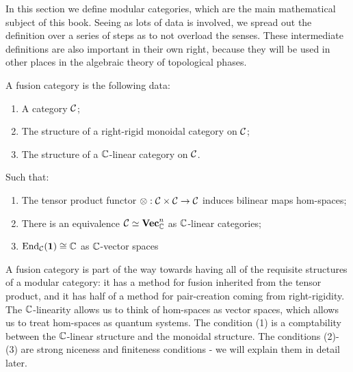 In this section we define modular categories, which are the main mathematical subject of this book. Seeing as lots of data is involved, we spread out the definition over a series of steps as to not overload the senses. These intermediate definitions are also important in their own right, because they will be used in other places in the algebraic theory of topological phases.


\begin{defn} A fusion category is the following data:

\begin{enumerate}
\item A category ${\mathcal C}$;
\item The structure of a right-rigid monoidal category on ${\mathcal C}$;
\item The structure of a ${\mathbb C}$-linear category on ${\mathcal C}$.
\end{enumerate}

Such that:

\begin{enumerate}
\item The tensor product functor $\otimes: {\mathcal C}\times {\mathcal C}\to {\mathcal C}$ induces bilinear maps hom-spaces;
\item There is an equivalence ${\mathcal C} \simeq {\bf Vec}_{\mathbb C}^n$ as ${\mathbb C}$-linear categories;
\item $\operatorname{End}_{\mathcal C}({\mathbf 1})\cong {\mathbb C}$ as ${\mathbb C}$-vector spaces
\end{enumerate}


\end{defn}

\begin{rem}
A fusion category is part of the way towards having all of the requisite structures of a modular category: it has a method for fusion inherited from the tensor product, and it has half of a method for pair-creation coming from right-rigidity. The ${\mathbb C}$-linearity allows us to think of hom-spaces as vector spaces, which allows us to treat hom-spaces as quantum systems. The condition (1) is a comptability between the ${\mathbb C}$-linear structure and the monoidal structure. The conditions (2)-(3) are strong niceness and finiteness conditions - we will explain them in detail later.
\end{rem}

